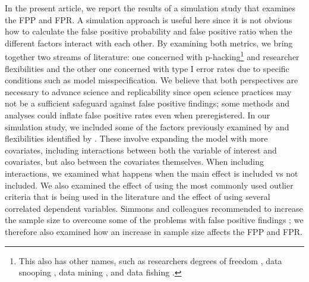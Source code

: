 In the present article, we report the results of a simulation study that examines the FPP and FPR. A simulation approach is useful here since it is not obvious how to calculate the false positive probability and false positive ratio when the different factors interact with each other. By examining both metrics, we bring together two streams of literature: one concerned with p-hacking\footnote{This also has other names, such as researchers degrees of freedom \citep{Simmons2011}, data snooping \citep{white2000reality}, data mining \citep{lovell1983}, and data fishing \citep{selvin1966data}.} \citep{simonsohn2014p} and researcher flexibilities and the other one concerned with type I error rates due to specific conditions such as model misspecification. We believe that both perspectives are necessary to advance science and replicability since open science practices may not be a sufficient safeguard against false positive findings; some methods and analyses could inflate false positive rates even when preregistered. In our simulation study, we included some of the factors previously examined by \cite{Simmons2011} and flexibilities identified by \cite{Wicherts2016}. These involve expanding the model with more covariates, including interactions between both the variable of interest and covariates, but also between the covariates themselves. When including interactions, we examined what happens when the main effect is included vs not included. We also examined the effect of using the most commonly used outlier criteria that is being used in the literature \citep{Leyes2013} and the effect of using several correlated dependent variables. Simmons and colleagues recommended to increase the sample size to overcome some of the problems with false positive findings \citep{Simmons2011}; we therefore also examined how an increase in sample size affects the FPP and FPR. 

